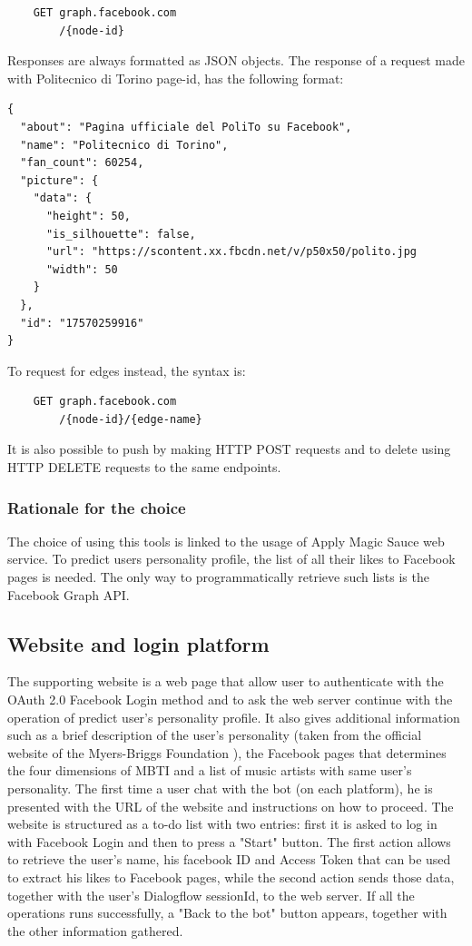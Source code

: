 \documentclass[b5paper,10pt,twoside,cucitura]{toptesi}
\begin{document}
\begin{verbatim}
    GET graph.facebook.com
        /{node-id}
\end{verbatim}

\noindent
Responses are always formatted as JSON objects. The response of a request made with Politecnico di Torino page-id, has the following format:

\begin{verbatim}
{
  "about": "Pagina ufficiale del PoliTo su Facebook",
  "name": "Politecnico di Torino",
  "fan_count": 60254,
  "picture": {
    "data": {
      "height": 50,
      "is_silhouette": false,
      "url": "https://scontent.xx.fbcdn.net/v/p50x50/polito.jpg
      "width": 50
    }
  },
  "id": "17570259916"
}
\end{verbatim}

To request for edges instead, the syntax is:

\begin{verbatim}
    GET graph.facebook.com
        /{node-id}/{edge-name}
\end{verbatim}

\noindent
It is also possible to push by making HTTP POST requests and to delete using HTTP DELETE requests to the same endpoints.

\subsubsection{Rationale for the choice}
The choice of using this tools is linked to the usage of Apply Magic Sauce web service. To predict users personality profile, the list of all their likes to Facebook pages is needed. The only way to 
programmatically retrieve such lists is the Facebook Graph API.

\subsection{Website and login platform}

The supporting website is a web page that allow user to authenticate with the OAuth 2.0 Facebook Login method and to ask the web server continue with the operation of predict user's personality profile. It also gives additional information such as a brief description of the user's personality (taken from the official website of the Myers-Briggs Foundation   \citep{MBfoundation}), the Facebook pages that determines the four dimensions of MBTI and a list of music artists with same user's personality. The first time a user chat with the bot (on each platform), he is presented with the URL of the website and instructions on how to proceed. The website is structured as a to-do list with two entries: first it is asked to log in with Facebook Login and then to press a "Start" button. The first action allows to retrieve the user's name, his facebook ID and Access Token that can be used to extract his likes to Facebook pages, while the second action sends those data, together with the user's Dialogflow sessionId, to the web server. If all the operations runs successfully, a "Back to the bot" button appears, together with the other information gathered.
\end{document}
